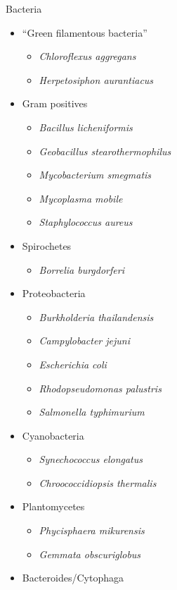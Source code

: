\documentclass[10pt,letterpaper]{article}
\begin{document}
Bacteria

\begin{itemize}
	\item ``Green filamentous bacteria''
	\begin{itemize}
		\item \textit{Chloroflexus aggregans}
		\item \textit{Herpetosiphon aurantiacus}
	\end{itemize}
	\item Gram positives
	\begin{itemize}
		\item \textit{Bacillus licheniformis}
		\item \textit{Geobacillus stearothermophilus}
		\item \textit{Mycobacterium smegmatis}
		\item \textit{Mycoplasma mobile}
		\item \textit{Staphylococcus aureus}
	\end{itemize}
	\item Spirochetes
	\begin{itemize}
		\item \textit{Borrelia burgdorferi}
	\end{itemize}
	\item Proteobacteria
	\begin{itemize}
		\item \textit{Burkholderia thailandensis}
		\item \textit{Campylobacter jejuni}
		\item \textit{Escherichia coli}
		\item \textit{Rhodopseudomonas palustris}
		\item \textit{Salmonella typhimurium}
	\end{itemize}
	\item Cyanobacteria
	\begin{itemize}
		\item \textit{Synechococcus elongatus}
		\item \textit{Chroococcidiopsis thermalis}
	\end{itemize}
	\item Plantomycetes
	\begin{itemize}
		\item \textit{Phycisphaera mikurensis}
		\item \textit{Gemmata obscuriglobus}
	\end{itemize}
	\item Bacteroides/Cytophaga

\end{itemize}
\end{document}
